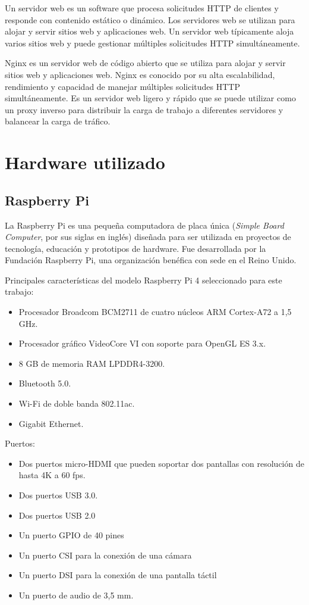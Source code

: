Un servidor web es un software que procesa solicitudes HTTP de clientes y responde con contenido estático o dinámico. Los servidores web se utilizan para alojar y servir sitios web y aplicaciones web. Un servidor web típicamente aloja varios sitios web y puede gestionar múltiples solicitudes HTTP simultáneamente.

Nginx \cite{WEBSITE:NGINX} es un servidor web de código abierto que se utiliza para alojar y servir sitios web y aplicaciones web. Nginx es conocido por su alta escalabilidad, rendimiento y capacidad de manejar múltiples solicitudes HTTP simultáneamente. Es un servidor web ligero y rápido que se puede utilizar como un proxy inverso para distribuir la carga de trabajo a diferentes servidores y balancear la carga de tráfico.

\section{Hardware utilizado}
\label{sec:hardware}

\subsection{Raspberry Pi}
\label{subsec:rbpi}

La Raspberry Pi \cite{WEBSITE:raspberrypi} es una pequeña computadora de placa única (\textit{Simple Board Computer}, por sus siglas en inglés) diseñada para ser utilizada en proyectos de tecnología, educación y prototipos de hardware. Fue desarrollada por la Fundación Raspberry Pi, una organización benéfica con sede en el Reino Unido.

Principales características del modelo Raspberry Pi 4 seleccionado para este trabajo:

\begin{itemize}
\item Procesador Broadcom BCM2711 de cuatro núcleos ARM Cortex-A72 a 1,5 GHz.
\item Procesador gráfico VideoCore VI con soporte para OpenGL ES 3.x. 
\item 8 GB de memoria RAM LPDDR4-3200.
\item Bluetooth 5.0.
\item Wi-Fi de doble banda 802.11ac.
\item Gigabit Ethernet.
\end{itemize}

Puertos:
\begin{itemize}
\item Dos puertos micro-HDMI que pueden soportar dos pantallas con resolución de hasta 4K a 60 fps.
\item Dos puertos USB 3.0.
\item Dos puertos USB 2.0
\item Un puerto GPIO de 40 pines
\item Un puerto CSI para la conexión de una cámara
\item Un puerto DSI para la conexión de una pantalla táctil
\item Un puerto de audio de 3,5 mm.
\end{itemize}

